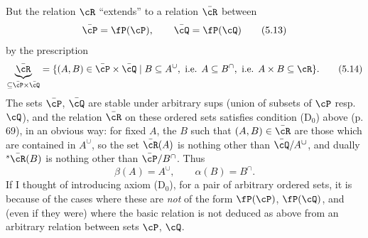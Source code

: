 But the relation $\cR$ ``extends'' to a relation $\bar{\cR}$ between
\[
\bar{\cP} = \fP(\cP), \qquad \bar{\cQ} = \fP(\cQ)
\tag*{(5.13)}
\]
by the prescription
\[
\underbrace{\bar{\cR}}_{\subseteq \bar{\cP} \times \bar{\cQ}} = \{(A,B) \in \bar{\cP} \times \bar{\cQ} \mid B \subseteq A^{\cup},\ \text{i.e. } A \subseteq B^{\cap},\ \text{i.e. } A \times B \subseteq \cR\}.
\tag*{(5.14)}
\]
The sets $\bar{\cP}$, $\bar{\cQ}$ are stable under arbitrary sups (union of subsets of $\cP$ resp. $\cQ$), and the relation $\bar{\cR}$ on these ordered sets satisfies condition (D$_0$)
above (p. 69), in an obvious way: for fixed $A$, the $B$ such that $(A,B) \in \bar{\cR}$ are those which are contained in $A^{\cup}$, so the set $\bar{\cR}(A)$ is nothing other than $\bar{\cQ}/A^{\cup}$, and dually ${}^{s}\bar{\cR}(B)$ is nothing other than $\bar{\cP}/B^{\cap}$. Thus
\[
\beta(A) = A^{\cup}, \qquad \alpha(B) = B^{\cap}.
\tag*{(5.14)} %
\]
If I thought of introducing axiom (D$_0$), for a pair of arbitrary ordered sets, it is because of the cases where these are \textit{not} of the form $\fP(\cP)$, $\fP(\cQ)$, and (even if they were) where the basic relation is not deduced as above from an arbitrary relation between sets $\cP$, $\cQ$.

